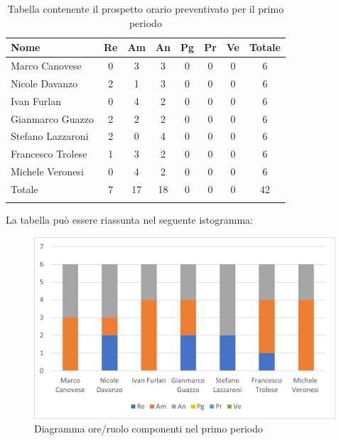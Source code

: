 			\begin{longtable}{|l|c|c|c|c|c|c|c|}
				\hline
				\rowcolor{lighter-grayer}
				\textbf{Nome} & \textbf{Re} & \textbf{Am} & \textbf{An} & \textbf{Pg}  & \textbf{Pr}   & \textbf{Ve} & \textbf{Totale} \\
				\hline
				\endfirsthead
				
				\hline
				Marco Canovese & 0 &3 & 3 & 0 & 0 & 0 & 6\\
				\hline
				\hline
				Nicole Davanzo & 2 & 1 & 3 & 0 & 0 & 0 & 6\\
				\hline
				\hline
				Ivan Furlan & 0 & 4 & 2 & 0 & 0 & 0 & 6\\
				\hline
				\hline
				Gianmarco Guazzo & 2 & 2 & 2 & 0 & 0 & 0 & 6\\
				\hline
				\hline
				Stefano Lazzaroni & 2 & 0 & 4 & 0 & 0 & 0 & 6\\
				\hline
				\hline
				Francesco Trolese & 1 & 3 & 2 & 0 & 0 & 0 & 6\\
				\hline
				\hline
				Michele Veronesi & 0 & 4 & 2 & 0 & 0 & 0 & 6\\
				\hline 
				\hline
				Totale & 7 & 17 & 18 & 0 & 0 & 0 & 42\\
				\hline
				\rowcolor{white} 
				\caption{Tabella contenente il prospetto orario preventivato per il primo periodo}
			\end{longtable}

		
			La tabella può essere riassunta nel seguente istogramma:
		
			\begin{figure}[H]
				\centering
				\includegraphics[width=0.8\linewidth]{res/images/preventivo/dettaglio_analisi/1-1.png}
				\caption{Diagramma ore/ruolo componenti nel primo periodo}
				\label{fig:diagramma suddivisione ruoli primo periodo analisi}
			\end{figure}
		
